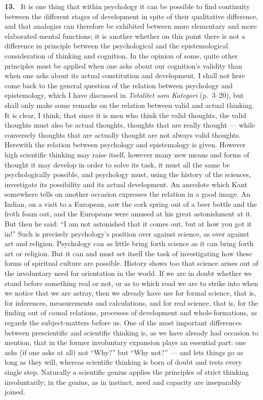 \documentclass[12pt]{book}
\newcommand{\hnum}[1]{\noindent\textbf{#1.}~}
\newcommand{\opage}[1]{\marginnote{\footnotesize\textit{[#1]}}}
\begin{document}
\hnum{13} It is one thing that within psychology it can be possible to find
continuity between the different stages of development in spite of their
qualitative difference, and that analogies can therefore be exhibited between
more elementary and more elaborated mental functions; it is another whether on
this point there is not a difference in principle between the psychological and
the epistemological consideration of thinking and cognition. In the opinion of
some, quite other principles must be applied when one asks about our cognition's
validity than when one asks about its actual constitution and development. I
shall not here come back to the general question of the relation between
psychology and epistemology, which I have discussed in \textit{Totalitet som
Kategori} (p.\ 3--20), but shall only make some remarks on the relation between
valid and actual thinking. It is clear, I think, that since it is men who think
the valid thoughts, the valid thoughts must also be actual thoughts, thoughts
that are really thought --- while conversely thoughts that are actually thought
are not always valid thoughts. Herewith the relation between psychology and
epistemology is given. However high scientific thinking may raise itself, however
many new means and forms of thought it may develop in order to solve its task, \opage{67}it
must all the same be psychologically possible, and psychology must, using the
history of the sciences, investigate its possibility and its actual development.
An anecdote which Kant somewhere tells on another occasion expresses the relation
in a good image. An Indian, on a visit to a European, saw the cork spring out of
a beer bottle and the froth foam out, and the Europeans were amused at his great
astonishment at it. But then he said: ``I am not astonished that it comes out,
but at how you got it in!'' Such is precisely psychology's position over against
science, as over against art and religion. Psychology can as little bring forth
science as it can bring forth art or religion. But it can and must set itself the
task of investigating how these forms of spiritual culture are possible. History
shows too that science arises out of the involuntary need for orientation in the
world. If we are in doubt whether we stand before something real or not, or as to
which road we are to strike into when we notice that we are astray, then we
already have use for formal science, that is, for inferences, measurements and
calculations, and for real science, that is, for the finding out of causal
relations, processes of development and whole-formations, as regards the
subject-matters before us. One of the most important differences between
prescientific and scientific thinking is, as we have already had occasion to
mention, that in the former involuntary expansion plays an essential part: one
asks (if one asks at all) not ``Why?'' but ``Why not?'' --- and lets things go as
long as they will, whereas scientific thinking is born of doubt and tests every
single step. Naturally a scientific genius applies the principles of strict
\opage{68}thinking involuntarily; in the genius, as in instinct, need and capacity are
inseparably joined.
\end{document}
